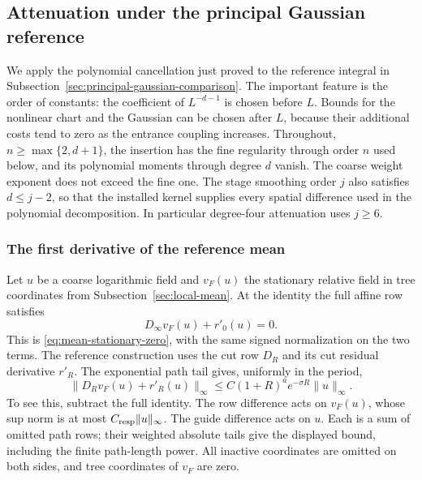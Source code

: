 \subsection{Attenuation under the principal Gaussian reference}
\label{sec:principal-reference-attenuation}
We apply the polynomial cancellation just proved to the reference
integral in Subsection~\ref{sec:principal-gaussian-comparison}.
The important feature is the order of constants: the coefficient
of $L^{-d-1}$ is chosen before $L$. Bounds for the nonlinear chart
and the Gaussian can be chosen after $L$, because their additional
costs tend to zero as the entrance coupling increases. Throughout,
$n\ge\max\{2,d+1\}$, the insertion has the fine regularity through
order $n$ used below, and its polynomial moments through degree $d$ vanish.
The coarse weight exponent does not exceed the fine one. The stage
smoothing order $j$ also satisfies $d\le j-2$, so that the installed
kernel supplies every spatial difference used in the polynomial
decomposition. In particular degree-four attenuation uses $j\ge6$.

\subsubsection{The first derivative of the reference mean}
Let $u$ be a coarse logarithmic field and $v_F(u)$ the stationary
relative field in tree coordinates from Subsection~\ref{sec:local-mean}.
At the identity the full affine row satisfies
\[
                     D_\infty v_F(u)+r'_0(u)=0.
\]
This is \eqref{eq:mean-stationary-zero}, with the same signed
normalization on the two terms. The reference construction uses
the cut row $D_R$ and its cut residual derivative $r'_R$.
The exponential path tail gives, uniformly in the period,
\begin{equation}\label{eq:reference-tangent-tail}
 \|D_Rv_F(u)+r'_R(u)\|_\infty
       \le C(1+R)^a e^{-\sigma R}\|u\|_\infty.
\end{equation}
To see this, subtract the full identity. The row difference acts
on $v_F(u)$, whose sup norm is at most $C_{\rm resp}\|u\|_\infty$.
The guide difference acts on $u$. Each is a sum of omitted path
rows; their weighted absolute tails give the displayed bound,
including the finite path-length power. All inactive coordinates
are omitted on both sides, and tree coordinates of $v_F$ are zero.

